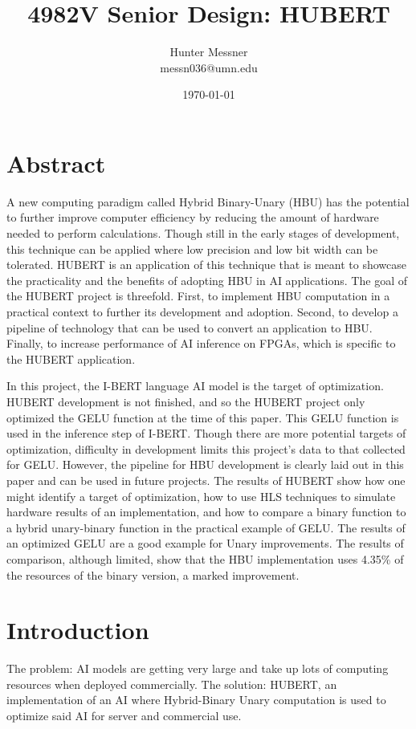 \documentclass[12pt]{article}
\title{4982V Senior Design: HUBERT}
\author{
	Hunter Messner\\messn036@umn.edu\\
}
\date{\today}
\begin{document}
	
	\maketitle
	
	\tableofcontents
	
	\listoffigures
	\newpage
	\section{Abstract}
	A new computing paradigm called Hybrid Binary-Unary (HBU) has the potential to further improve computer efficiency by reducing the amount of hardware needed to perform calculations. Though still in the early stages of development, this technique can be applied where low precision and low bit width can be tolerated. HUBERT is an application of this technique that is meant to showcase the practicality and the benefits of adopting HBU in AI applications.
	The goal of the HUBERT project is threefold. First, to implement HBU computation in a practical context to further its development and adoption. Second, to develop a pipeline of technology that can be used to convert an application to HBU. Finally, to increase performance of AI inference on FPGAs, which is specific to the HUBERT application. 
	
	In this project, the I-BERT language AI model is the target of optimization. HUBERT development is not finished, and so the HUBERT project only optimized the GELU function at the time of this paper. This GELU function is used in the inference step of I-BERT. Though there are more potential targets of optimization, difficulty in development limits this project’s data to that collected for GELU. However, the pipeline for HBU development is clearly laid out in this paper and can be used in future projects. The results of HUBERT show how one might identify a target of optimization, how to use HLS techniques to simulate hardware results of an implementation, and how to compare a binary function to a hybrid unary-binary function in the practical example of GELU. The results of an optimized GELU are a good example for Unary improvements. The results of comparison, although limited, show that the HBU implementation uses 4.35\% of the resources of the binary version, a marked improvement.
	
	\section{Introduction}
	The problem: AI models are getting very large and take up lots of computing resources when deployed commercially. The solution: HUBERT, an implementation of an AI where Hybrid-Binary Unary computation is used to optimize said AI for server and commercial use.
	
\end{document}
